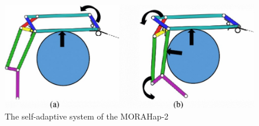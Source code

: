 \documentclass[a4paper, 10pt, conference]{ieeeconf}      %
\begin{document}
\begin{figure}[h]

	\centering
	\includegraphics[scale=0.3]{images/MORAHap-22}
	
	\caption{The self-adaptive system of the MORAHap-2}
	\label{fig:mora}
\end{figure}



\end{document}
